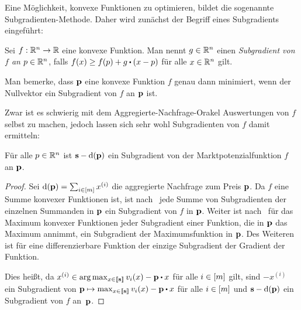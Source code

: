 Eine Möglichkeit, konvexe Funktionen zu optimieren, bildet die sogenannte Subgradienten-Methode.
Daher wird zunächst der Begriff eines Subgradients eingeführt:
\begin{definition}[Subgradient]
	Sei $f:\R^n \rightarrow \R$ eine konvexe Funktion.
	Man nennt $g\in\mathbb{R}^n$ einen \emph{Subgradient von $f$ an $p\in\R^n$}, falls $f(x) \geq f(p) + g\bcdot (x - p)$ für alle $x\in\mathbb{R}^n$ gilt.
\end{definition}
Man bemerke, dass $\mathbf{p}$ eine konvexe Funktion $f$ genau dann minimiert, wenn der Nullvektor ein Subgradient von $f$ an $\mathbf{p}$ ist.

\iffalse
\begin{proposition}\label{prop-convex-lipschitz}
Sei $f: \R^n \rightarrow \R$ eine konvexe und bezüglich $\norm{\cdot}$ Lipschitz-stetige Funktion mit Lipschitz-Konstante $L$.
Dann gilt $\norm{g}\leq L$ für jeden Subgradienten $g$ von $f$ an jedem Punkt $p\in\R^n$.
\end{proposition}
\begin{proof}
Es gilt $\norm{g} = g \bcdot (g \cdot \norm{g}^{-1}) \leq  f(g \cdot \norm{g}^{-1} + p) - f(p) \leq L \cdot \norm{g}\cdot \norm{g}^{-1} = L$.
\end{proof}
\fi

Zwar ist es schwierig mit dem Aggregierte-Nachfrage-Orakel Auswertungen von $f$ selbst zu machen, jedoch lassen sich sehr wohl Subgradienten von $f$ damit ermitteln:
\begin{lemma}\label{lemma-subgradient}
	Für alle $p\in\R^n$ ist $\mathbf{s} - \operatorname{d}(\mathbf{p})$ ein Subgradient von der Marktpotenzialfunktion $f$ an $\mathbf{p}$.
\end{lemma}
\begin{proof}
	Sei $\operatorname{d}(\mathbf{p}) = \sum_{i\in\left[ m \right]} x^{(i)}$ die aggregierte Nachfrage zum Preis $\mathbf{p}$.
	Da $f$ eine Summe konvexer Funktionen ist, ist nach~\cite[Theorem~1.12]{Shor1985} jede Summe von Subgradienten der einzelnen Summanden in $\mathbf{p}$ ein Subgradient von $f$ in $\mathbf{p}$.
	Weiter ist nach~\cite[Theorem~1.13]{Shor1985} für das Maximum konvexer Funktionen jeder Subgradient einer Funktion, die in $\mathbf{p}$ das Maximum annimmt, ein Subgradient der Maximumsfunktion in $\mathbf{p}$.
	Des Weiteren ist für eine differenzierbare Funktion der einzige Subgradient der Gradient der Funktion.
	
	Dies heißt, da $x^{(i)}\in \arg\max_{x\in\ffirst{\fs}} v_i(x) - \fp \bcdot x$ für alle $i\in\left[ m \right]$ gilt, sind $-x^{(i)}$ ein Subgradient von $\fp \mapsto \max_{x\in\ffirst{\fs}} v_i(x) - \fp \bcdot x$ für alle $i\in\left[ m \right]$ und $\mathbf{s} - \operatorname{d}(\mathbf{p})$ ein Subgradient von $f$ an~$\mathbf{p}$.
\end{proof}

